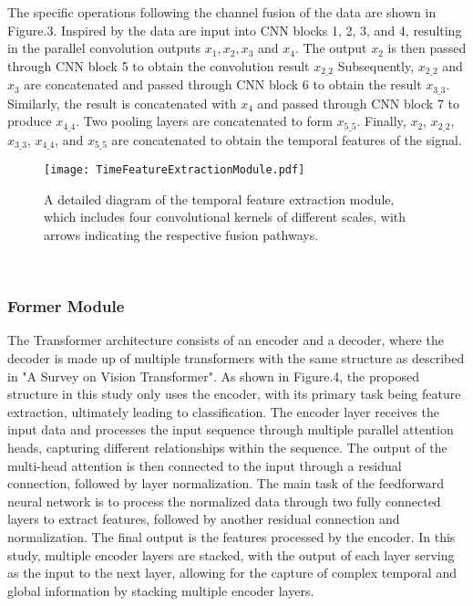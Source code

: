 \documentclass[10pt]{iopart}
\begin{document}
The specific operations following the channel fusion of the data are shown in Figure.3. Inspired by\cite{szegedy2015going} the data are input into CNN blocks 1, 2, 3, and 4, resulting in the parallel convolution outputs $x_1,x_2,x_3$ and $x_4$. The output $x_2$ is then passed through CNN block 5 to obtain the convolution result $x_{\text{2\_2}}$ Subsequently, $x_{\text{2\_2}}$ and $x_3$ are concatenated and passed through CNN block 6 to obtain the result $x_{\text{3\_3}}$. Similarly, the result is concatenated with $x_4$ and passed through CNN block 7 to produce $x_{\text{4\_4}}$. Two pooling layers are concatenated to form $x_{\text{5\_5}}$. Finally, $x_2$, $x_{\text{2\_2}}$, $x_{\text{3\_3}}$, $x_{\text{4\_4}}$, and $x_{\text{5\_5}}$ are concatenated to obtain the temporal features of the signal.
\begin{figure*}[ht]
    \centering
    \texttt{[image: TimeFeatureExtractionModule.pdf]}
    \caption{A detailed diagram of the temporal feature extraction module, which includes four convolutional kernels of different scales, with arrows indicating the respective fusion pathways.}
\end{figure*}
‌\subsubsection{Former Module\\}
The Transformer architecture consists of an encoder and a decoder, where the decoder is made up of multiple transformers with the same structure as described in "A Survey on Vision Transformer"\cite{han2022survey}. As shown in  Figure.4, the proposed  structure in this study only uses the encoder, with its primary task being feature extraction, ultimately leading to classification. The encoder layer receives the input data and processes the input sequence through multiple parallel attention heads, capturing different relationships within the sequence. The output of the multi-head attention is then connected to the input through a residual connection, followed by layer normalization. The main task of the feedforward neural network is to process the normalized data through two fully connected layers to extract features, followed by another residual connection and normalization. The final output is the features processed by the encoder. In this study, multiple encoder layers are stacked, with the output of each layer serving as the input to the next layer, allowing for the capture of complex temporal and global information by stacking multiple encoder layers.
\end{document}
